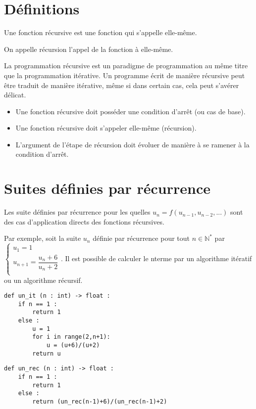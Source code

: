 \section{Définitions}
\begin{defi}%
Une fonction récursive est une fonction qui s'appelle elle-même.

On appelle récursion l'appel de la fonction à elle-même.
\end{defi}

La programmation récursive est un paradigme de programmation au même titre que la programmation itérative. Un programme écrit de manière récursive peut être traduit de manière itérative, même si dans certain cas, cela peut s'avérer délicat.


\begin{methode}
\begin{itemize}
\item Une fonction récursive doit posséder une condition d'arrêt (ou cas de base).
\item Une fonction récursive doit s'appeler elle-même (récursion).
\item L'argument de l'étape de récursion doit évoluer de manière à se ramener à la condition d'arrêt.
\end{itemize}
\end{methode}
 
 



\section{Suites définies par récurrence}

Les suite définies par récurrence pour les quelles $u_{n}=f\left(u_{n-1},u_{n-2},...\right)$ sont des cas d'application directs des fonctions récursives. 

Par exemple, soit la suite $u_n$ définie par récurrence pour tout $n\in\mathbb{N}^*$ par 
$
\left\{
\begin{array}{ll} 
u_1 = 1 \\
u_{n+1} = \dfrac{u_n + 6}{u_n + 2} \\
\end{array}
\right.
$. Il est possible de calculer le n\ieme terme par un algorithme itératif ou un algorithme récursif. 

\noindent\begin{minipage}[c]{.45\linewidth}
\begin{lstlisting}
def un_it (n : int) -> float :
    if n == 1 :
        return 1
    else : 
        u = 1
        for i in range(2,n+1):
            u = (u+6)/(u+2)
        return u
\end{lstlisting}
\end{minipage} \hfill
\begin{minipage}[c]{.45\linewidth}
\begin{lstlisting}
def un_rec (n : int) -> float :
    if n == 1 :
        return 1
    else : 
        return (un_rec(n-1)+6)/(un_rec(n-1)+2)
\end{lstlisting}
\end{minipage} 

